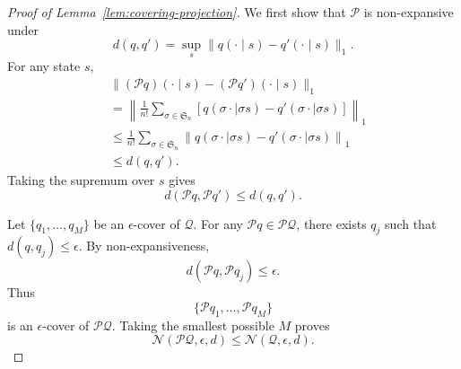 \begin{proof}[Proof of Lemma~\ref{lem:covering-projection}]

We first show that $\mathcal P$ is non-expansive under
\[
    d(q,q')=\sup_s\|q(\cdot\mid s)-q'(\cdot\mid s)\|_1 .
\]
For any state $s$,
\[
\begin{aligned}
    &
    \|(\mathcal Pq)(\cdot\mid s)-(\mathcal Pq')(\cdot\mid s)\|_1 \\
    &=
    \left\|
    \frac{1}{n!}
    \sum_{\sigma\in\mathfrak S_n}
    \left[
    q(\sigma\cdot\mid \sigma s)
    -
    q'(\sigma\cdot\mid \sigma s)
    \right]
    \right\|_1 \\
    &\le
    \frac{1}{n!}
    \sum_{\sigma\in\mathfrak S_n}
    \left\|
    q(\sigma\cdot\mid \sigma s)
    -
    q'(\sigma\cdot\mid \sigma s)
    \right\|_1 \\
    &\le d(q,q').
\end{aligned}
\]
Taking the supremum over $s$ gives
\[
    d(\mathcal Pq,\mathcal Pq')\le d(q,q').
\]

Let $\{q_1,\ldots,q_M\}$ be an $\epsilon$-cover of $\mathcal Q$. For any
$\mathcal Pq\in\mathcal P\mathcal Q$, there exists $q_j$ such that
$d(q,q_j)\le\epsilon$. By non-expansiveness,
\[
    d(\mathcal Pq,\mathcal Pq_j)\le \epsilon.
\]
Thus
\[
    \{\mathcal Pq_1,\ldots,\mathcal Pq_M\}
\]
is an $\epsilon$-cover of $\mathcal P\mathcal Q$. Taking the smallest possible
$M$ proves
\[
    \mathcal N(\mathcal P\mathcal Q,\epsilon,d)
    \le
    \mathcal N(\mathcal Q,\epsilon,d).
\]
\end{proof}



